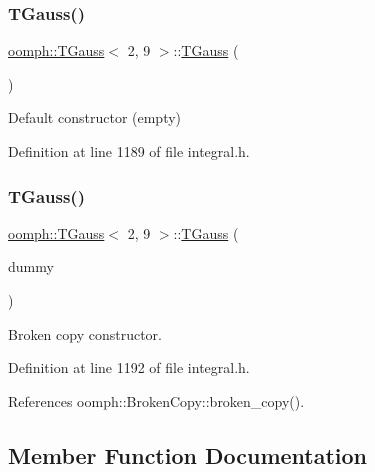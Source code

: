 \subsubsection{\texorpdfstring{T\+Gauss()}{TGauss()}\hspace{0.1cm}{\footnotesize\ttfamily [1/2]}}
{\footnotesize\ttfamily \hyperlink{classoomph_1_1TGauss}{oomph\+::\+T\+Gauss}$<$ 2, 9 $>$\+::\hyperlink{classoomph_1_1TGauss}{T\+Gauss} (\begin{DoxyParamCaption}{ }\end{DoxyParamCaption})\hspace{0.3cm}{\ttfamily [inline]}}



Default constructor (empty) 



Definition at line 1189 of file integral.\+h.

\mbox{\label{classoomph_1_1TGauss_3_012_00_019_01_4_aadf17084278cb9c5cfdfe5cb9b5cd099}} 
\subsubsection{\texorpdfstring{T\+Gauss()}{TGauss()}\hspace{0.1cm}{\footnotesize\ttfamily [2/2]}}
{\footnotesize\ttfamily \hyperlink{classoomph_1_1TGauss}{oomph\+::\+T\+Gauss}$<$ 2, 9 $>$\+::\hyperlink{classoomph_1_1TGauss}{T\+Gauss} (\begin{DoxyParamCaption}\item[{const \hyperlink{classoomph_1_1TGauss}{T\+Gauss}$<$ 2, 9 $>$ \&}]{dummy }\end{DoxyParamCaption})\hspace{0.3cm}{\ttfamily [inline]}}



Broken copy constructor. 



Definition at line 1192 of file integral.\+h.



References oomph\+::\+Broken\+Copy\+::broken\+\_\+copy().



\subsection{Member Function Documentation}
\mbox{\label{classoomph_1_1TGauss_3_012_00_019_01_4_a0c1b41403e6293064a80ce1d7977b27d}} 
